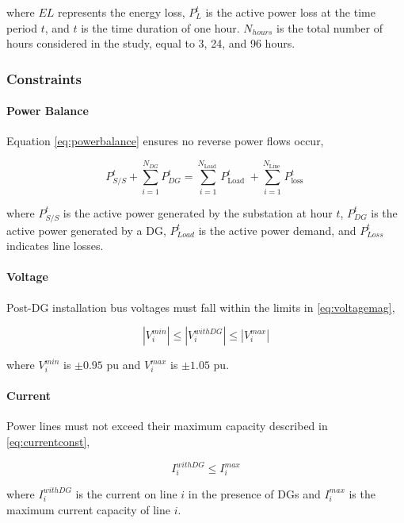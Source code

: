 \documentclass[conference]{IEEEtran}
\begin{document}
where $EL$ represents the energy loss, $P_L^t$ is the active power loss at the time period $t$, and $t$ is the time duration of one hour. $N_{hours}$ is the total number of hours considered in the study, equal to 3, 24, and 96 hours.


\subsubsection{Constraints}
\paragraph{Power Balance}
Equation \eqref{eq:powerbalance} ensures no reverse power flows occur,

\begin{equation}
	P_{S / S}^t+\sum_{i=1}^{N_{D G}} P_{D G}^t=\sum_{i=1}^{N_{\text {Load }}} P_{\text {Load }}^t+\sum_{i=1}^{N_{\text {Line }}} P_{\text {loss }}^t
	\label{eq:powerbalance}
\end{equation}

where $P_{S/S}^t$ is the active power generated by the substation at hour $t$, $P_{DG}^t$ is the active power generated by a DG, $P_{Load}^t$ is the  active power demand, and $P_{Loss}^t$ indicates line losses. 

\paragraph{Voltage}
Post-DG installation bus voltages must fall within the limits in \eqref{eq:voltagemag},

\begin{equation}
	\left|V_{i}^{m i n}\right|\leq\left|V_{i}^{withDG}\right|\leq\left|V_{i}^{m a x}\right|
	\label{eq:voltagemag}
\end{equation}

where \(V_i^{min}\) is $\pm 0.95$ pu and \(V_i^{max}\) is $\pm 1.05$ pu.

\paragraph{Current}
Power lines must not exceed their maximum capacity described in \eqref{eq:currentconst},

\begin{equation}
	I_{i}^{withDG} \leq I_{i}^{max}
	\label{eq:currentconst}
\end{equation}

where \(I_i^{withDG}\) is the current on line \(i\) in the presence of DGs and \(I_i^{max}\) is the maximum current capacity of line \(i\).
\end{document}
